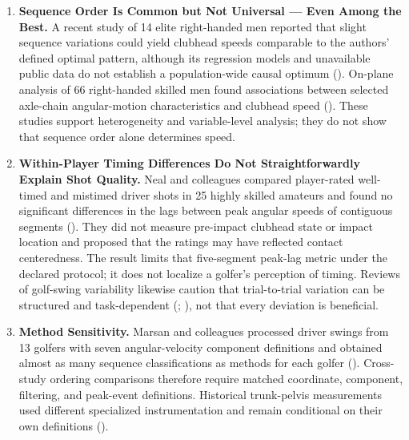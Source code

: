 \documentclass[
  letterpaper,
]{report}
\begin{document}
\begin{enumerate}
\def\labelenumi{\arabic{enumi}.}
\item
  \textbf{Sequence Order Is Common but Not Universal --- Even Among the
  Best.} A recent study of 14 elite right-handed men reported that
  slight sequence variations could yield clubhead speeds comparable to
  the authors' defined optimal pattern, although its regression models
  and unavailable public data do not establish a population-wide causal
  optimum ().
  On-plane analysis of 66 right-handed skilled men found associations
  between selected axle-chain angular-motion characteristics and
  clubhead speed (). These
  studies support heterogeneity and variable-level analysis; they do not
  show that sequence order alone determines speed.
\item
  \textbf{Within-Player Timing Differences Do Not Straightforwardly
  Explain Shot Quality.} Neal and colleagues compared player-rated
  well-timed and mistimed driver shots in 25 highly skilled amateurs and
  found no significant differences in the lags between peak angular
  speeds of contiguous segments (). They did not measure pre-impact clubhead state or impact
  location and proposed that the ratings may have reflected contact
  centeredness. The result limits that five-segment peak-lag metric
  under the declared protocol; it does not localize a golfer's
  perception of timing. Reviews of golf-swing variability likewise
  caution that trial-to-trial variation can be structured and
  task-dependent (; ), not that every
  deviation is beneficial.
\item
  \textbf{Method Sensitivity.} Marsan and colleagues processed driver
  swings from 13 golfers with seven angular-velocity component
  definitions and obtained almost as many sequence classifications as
  methods for each golfer (). Cross-study ordering comparisons therefore require matched
  coordinate, component, filtering, and peak-event definitions.
  Historical trunk-pelvis measurements used different specialized
  instrumentation and remain conditional on their own definitions
  ().
\end{enumerate}
\end{document}
